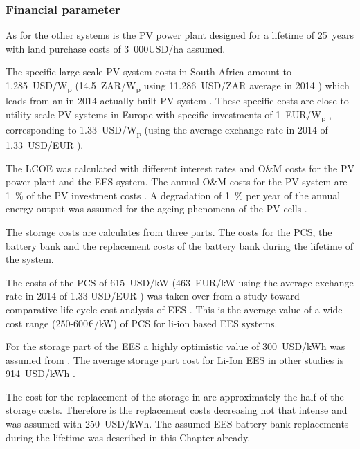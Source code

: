 \subsubsection{Financial parameter} \label{SUBSUBPVFinancialparameter}
As for the other systems is the PV power plant designed for a lifetime of \SI{25}{years} with land purchase costs of 3~000USD/ha \cite{Cassell2012} assumed.

The specific large-scale PV system costs in South Africa  amount to \SI{1.285}{USD/W}\textsubscript{p} (\SI{14.5}{ZAR/W}\textsubscript{p} using \SI{11.286}{USD/ZAR} average in 2014 \cite{IRS2015}) which leads from an in 2014 actually built PV system \cite{Terblanche2015}. These specific costs are close to utility-scale PV systems in Europe with specific investments of \SI{1}{EUR/W}\textsubscript{p} \cite{FraunhoferISE2013}, corresponding to \SI{1.33}{USD/W}\textsubscript{p} (using the average exchange rate in 2014 of \SI{1.33}{USD/EUR}  \cite{StatistaGmbH2015}).

The LCOE was calculated with different interest rates and O\&M costs for the PV power plant and the EES system. The annual O\&M costs for the PV system are \SI{1}{\percent}  of the PV investment costs \cite{IEA2014a}. A degradation of \SI{1}{\percent} per year of the annual energy output was assumed for the ageing phenomena of the PV cells \cite{Tidball2010}.

The storage costs are calculates from three  parts. The costs for the PCS, the battery bank and the replacement costs of the battery bank during the lifetime of the system.

The costs of the PCS of \SI{615}{USD/kW} (\SI{463}{EUR/kW} using the average exchange rate in 2014 of 1.33 USD/EUR \cite{StatistaGmbH2015}) was taken over from a study toward comparative life cycle cost analysis of EES \cite{Zakeri2015}. This is the average value of  a wide cost range (250-600€/kW) of PCS for li-ion based EES systems.

For the storage part of the EES a highly optimistic value of \SI{300}{USD/kWh} was assumed from \cite{Nykvist2015}. The average storage part cost for Li-Ion EES in other studies is \SI{914}{USD/kWh} \cite{Zakeri2015}.

The cost for the replacement of the storage in \cite{Zakeri2015} are approximately the half of the storage costs. Therefore is the replacement costs decreasing not that intense and was assumed with \SI{250}{USD/kWh}. The assumed EES battery bank replacements during the lifetime was described in this Chapter already.

